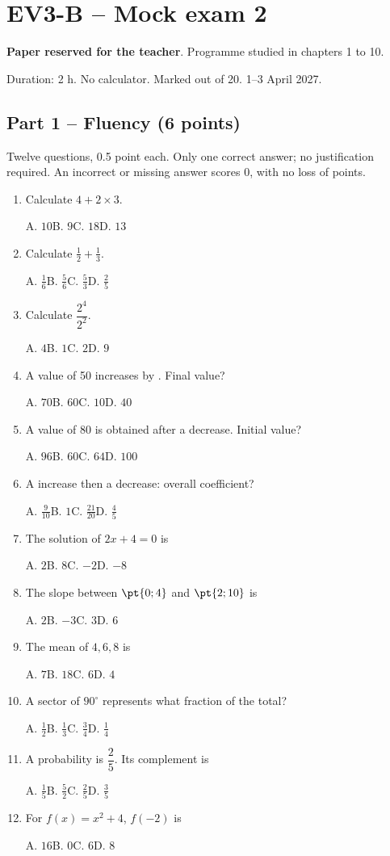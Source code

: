 \mxnewpage\section*{EV3-B -- Mock exam 2}\label{EV3-B}
\textbf{Paper reserved for the teacher}. Programme studied in chapters 1 to 10.\par Duration: 2 h. No calculator. Marked out of 20. 1--3 April 2027.
\subsection*{Part 1 -- Fluency (6 points)}
Twelve questions, \num{0,5} point each. Only one correct answer; no justification required. An incorrect or missing answer scores 0, with no loss of points.
\begin{enumerate}
\item Calculate $4+2\times3$.\par A. $10$\quad B. $9$\quad C. $18$\quad D. $13$
\item Calculate $\frac12+\frac13$.\par A. $\frac{1}{6}$\quad B. $\frac{5}{6}$\quad C. $\frac{5}{3}$\quad D. $\frac{2}{5}$
\item Calculate $\dfrac{2^4}{2^{2}}$.\par A. $4$\quad B. $1$\quad C. $2$\quad D. $9$
\item A value of 50 increases by . Final value?\par A. $70$\quad B. $60$\quad C. $10$\quad D. $40$
\item A value of 80 is obtained after a  decrease. Initial value?\par A. $96$\quad B. $60$\quad C. $64$\quad D. $100$
\item A  increase then a  decrease: overall coefficient?\par A. $\frac{9}{10}$\quad B. $1$\quad C. $\frac{21}{20}$\quad D. $\frac{4}{5}$
\item The solution of $2x+4=0$ is\par A. $2$\quad B. $8$\quad C. $-2$\quad D. $-8$
\item The slope between $\pt{0;4}$ and $\pt{2;10}$ is\par A. $2$\quad B. $-3$\quad C. $3$\quad D. $6$
\item The mean of $4, 6, 8$ is\par A. $7$\quad B. $18$\quad C. $6$\quad D. $4$
\item A sector of $90^\circ$ represents what fraction of the total?\par A. $\frac{1}{2}$\quad B. $\frac{1}{3}$\quad C. $\frac{3}{4}$\quad D. $\frac{1}{4}$
\item A probability is $\dfrac{2}{5}$. Its complement is\par A. $\frac{1}{5}$\quad B. $\frac{5}{2}$\quad C. $\frac{2}{5}$\quad D. $\frac{3}{5}$
\item For $f(x)=x^2+4$, $f(-2)$ is\par A. $16$\quad B. $0$\quad C. $6$\quad D. $8$
\end{enumerate}
